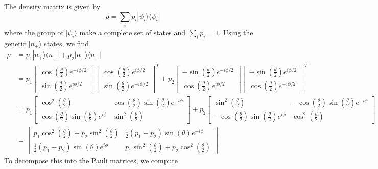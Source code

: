 \documentclass[../principles-of-quantum-mechanics.tex]{subfiles}
\begin{document}
\begin{questions}
		\begin{solution}
			The density matrix is given by
			$$\rho = \sum_i p_i|\psi_i\rangle\langle\psi_i|$$
			where the group of $|\psi_i\rangle$ make a complete set of states and $\sum_i p_i = 1$. Using the generic $|n_\pm\rangle$ states, we find
			\begin{align*}
				\rho &= p_1|n_+\rangle\langle n_+| + p_2|n_-\rangle\langle n_-| \\
				&= p_1\begin{bmatrix}\cos(\tfrac{\theta}{2})e^{-i\phi/2} \\ \sin(\tfrac{\theta}{2})e^{i\phi/2}\end{bmatrix}\begin{bmatrix}\cos(\tfrac{\theta}{2})e^{i\phi/2} \\ \sin(\tfrac{\theta}{2})e^{-i\phi/2}\end{bmatrix}^T + p_2\begin{bmatrix}-\sin(\tfrac{\theta}{2})e^{-i\phi/2} \\ \cos(\tfrac{\theta}{2})e^{i\phi/2}\end{bmatrix}\begin{bmatrix}-\sin(\tfrac{\theta}{2})e^{i\phi/2} \\ \cos(\tfrac{\theta}{2})e^{-i\phi/2}\end{bmatrix}^T \\
				&= p_1\begin{bmatrix}\cos^2(\tfrac{\theta}{2}) & \cos(\tfrac{\theta}{2})\sin(\tfrac{\theta}{2})e^{-i\phi} \\
				\cos(\tfrac{\theta}{2})\sin(\tfrac{\theta}{2})e^{i\phi} & \sin^2(\tfrac{\theta}{2})\end{bmatrix} + p_2\begin{bmatrix}
				\sin^2(\tfrac{\theta}{2}) & -\cos(\tfrac{\theta}{2})\sin(\tfrac{\theta}{2})e^{-i\phi} \\
				-\cos(\tfrac{\theta}{2})\sin(\tfrac{\theta}{2})e^{i\phi} & \cos^2(\tfrac{\theta}{2})
			\end{bmatrix} \\
			&= \begin{bmatrix}
				p_1\cos^2(\tfrac{\theta}{2}) + p_2\sin^2(\tfrac{\theta}{2}) & \tfrac{1}{2}(p_1 - p_2)\sin(\theta)e^{-i\phi} \\
				\tfrac{1}{2}(p_1-p_2)\sin(\theta)e^{i\phi} & p_1\sin^2(\tfrac{\theta}{2}) + p_2\cos^2(\tfrac{\theta}{2})
			\end{bmatrix}
			\end{align*}
			To decompose this into the Pauli matrices, we compute

\end{solution}
\end{questions}
\end{document}
